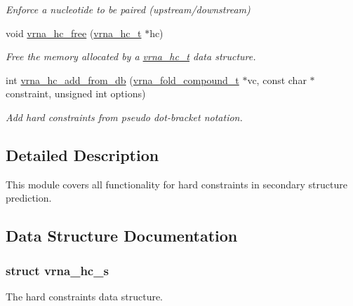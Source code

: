 \begin{DoxyCompactItemize}
\begin{DoxyCompactList}\small\item\em Enforce a nucleotide to be paired (upstream/downstream) \end{DoxyCompactList}\item 
void \hyperlink{group__hard__constraints_ga696dcf77887d856c6f21ea266d8b9ca2}{vrna\+\_\+hc\+\_\+free} (\hyperlink{group__hard__constraints_gac7e4c4f8abe3163a68110c5bff24e01d}{vrna\+\_\+hc\+\_\+t} $\ast$hc)
\begin{DoxyCompactList}\small\item\em Free the memory allocated by a \hyperlink{group__hard__constraints_gac7e4c4f8abe3163a68110c5bff24e01d}{vrna\+\_\+hc\+\_\+t} data structure. \end{DoxyCompactList}\item 
int \hyperlink{group__hard__constraints_ga5b4de3247b67358080c176b94591a8e6}{vrna\+\_\+hc\+\_\+add\+\_\+from\+\_\+db} (\hyperlink{group__fold__compound_ga1b0cef17fd40466cef5968eaeeff6166}{vrna\+\_\+fold\+\_\+compound\+\_\+t} $\ast$vc, const char $\ast$constraint, unsigned int options)
\begin{DoxyCompactList}\small\item\em Add hard constraints from pseudo dot-\/bracket notation. \end{DoxyCompactList}\end{DoxyCompactItemize}


\subsection{Detailed Description}
This module covers all functionality for hard constraints in secondary structure prediction. 



\subsection{Data Structure Documentation}
\label{structvrna__hc__s}
\hypertarget{group__hard__constraints_structvrna__hc__s}{}
\subsubsection{struct vrna\+\_\+hc\+\_\+s}
The hard constraints data structure. 

